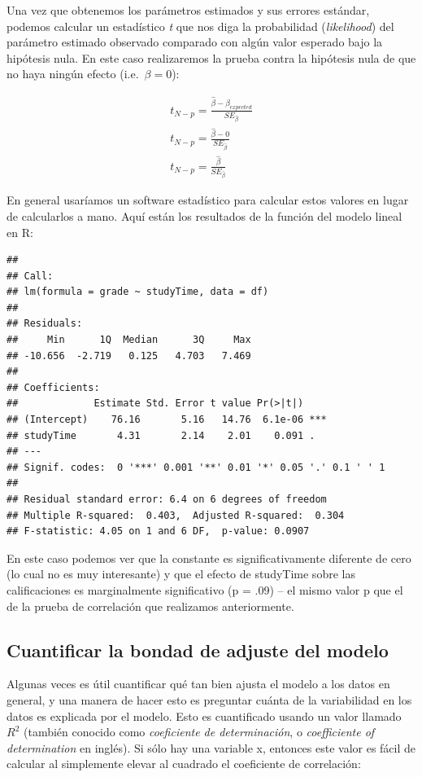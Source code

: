 \documentclass[
  12pt,
]{book}
\begin{document}
Una vez que obtenemos los parámetros estimados y sus errores estándar, podemos calcular un estadístico \emph{t} que nos diga la probabilidad (\emph{likelihood}) del parámetro estimado observado comparado con algún valor esperado bajo la hipótesis nula. En este caso realizaremos la prueba contra la hipótesis nula de que no haya ningún efecto (i.e.~\(\beta=0\)):

\[
\begin{array}{c}
t_{N - p} = \frac{\hat{\beta} - \beta_{expected}}{SE_{\hat{\beta}}}\\
t_{N - p} = \frac{\hat{\beta} - 0}{SE_{\hat{\beta}}}\\
t_{N - p} = \frac{\hat{\beta} }{SE_{\hat{\beta}}}
\end{array}
\]

En general usaríamos un software estadístico para calcular estos valores en lugar de calcularlos a mano. Aquí están los resultados de la función del modelo lineal en R:

\begin{verbatim}
## 
## Call:
## lm(formula = grade ~ studyTime, data = df)
## 
## Residuals:
##     Min      1Q  Median      3Q     Max 
## -10.656  -2.719   0.125   4.703   7.469 
## 
## Coefficients:
##             Estimate Std. Error t value Pr(>|t|)    
## (Intercept)    76.16       5.16   14.76  6.1e-06 ***
## studyTime       4.31       2.14    2.01    0.091 .  
## ---
## Signif. codes:  0 '***' 0.001 '**' 0.01 '*' 0.05 '.' 0.1 ' ' 1
## 
## Residual standard error: 6.4 on 6 degrees of freedom
## Multiple R-squared:  0.403,  Adjusted R-squared:  0.304 
## F-statistic: 4.05 on 1 and 6 DF,  p-value: 0.0907
\end{verbatim}

En este caso podemos ver que la constante es significativamente diferente de cero (lo cual no es muy interesante) y que el efecto de studyTime sobre las calificaciones es marginalmente significativo (p = .09) -- el mismo valor p que el de la prueba de correlación que realizamos anteriormente.

\hypertarget{cuantificar-la-bondad-de-adjuste-del-modelo}{%
\subsection{Cuantificar la bondad de adjuste del modelo}\label{cuantificar-la-bondad-de-adjuste-del-modelo}}

Algunas veces es útil cuantificar qué tan bien ajusta el modelo a los datos en general, y una manera de hacer esto es preguntar cuánta de la variabilidad en los datos es explicada por el modelo. Esto es cuantificado usando un valor llamado \(R^2\) (también conocido como \emph{coeficiente de determinación}, o \emph{coefficiente of determination} en inglés). Si sólo hay una variable x, entonces este valor es fácil de calcular al simplemente elevar al cuadrado el coeficiente de correlación:
\end{document}
